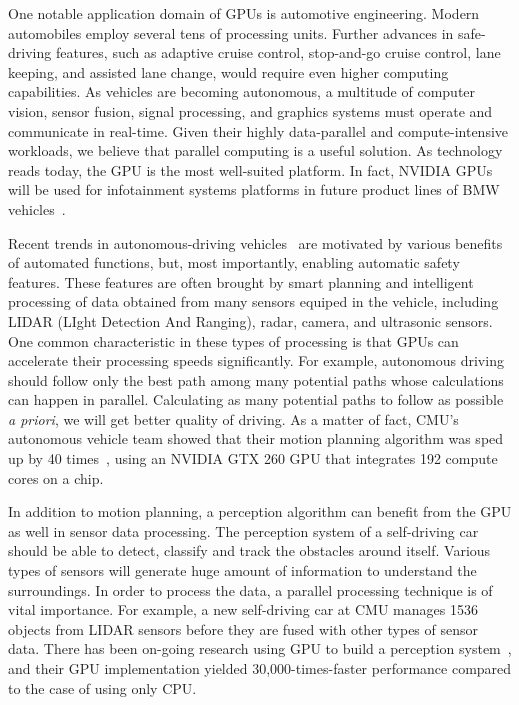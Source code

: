 \documentclass[times, 10pt, twocolumn]{article}
\begin{document}
One notable application domain of GPUs is automotive engineering.
Modern automobiles employ several tens of processing units.
Further advances in safe-driving features, such as adaptive
cruise control, stop-and-go cruise control, lane keeping, and assisted
lane change, would require even higher computing capabilities.
As vehicles are becoming autonomous, a multitude of computer vision,
sensor fusion, signal processing, and graphics systems must operate and
communicate in real-time.
Given their highly data-parallel and compute-intensive workloads, 
we believe that parallel computing is a useful solution.
As technology reads today, the GPU is the most well-suited platform.
In fact, NVIDIA GPUs will be used for infotainment systems platforms in
future product lines of BMW vehicles~\cite{NVIDIA_BMW}.

Recent trends in autonomous-driving vehicles~\cite{Kelly12, Markoff10,
Urmson08} are motivated by various benefits of automated functions,
but, most importantly, enabling automatic safety features. 
These features are often brought by smart planning and intelligent
processing of data obtained from many sensors equiped in the vehicle,
including LIDAR (LIght Detection And Ranging), radar, camera, and
ultrasonic sensors. 
One common characteristic in these types of processing is that GPUs can
accelerate their processing speeds significantly.
For example, autonomous driving should follow only the best path among
many potential paths whose calculations can happen in parallel.
Calculating as many potential paths to follow as possible
{\it a priori}, we will get better quality of driving.
As a matter of fact, CMU's autonomous vehicle team showed that their
motion planning algorithm was sped up by 40 times~\cite{McNaughton11},
using an NVIDIA GTX 260 GPU that integrates 192 compute cores on a
chip.

In addition to motion planning, a perception algorithm can benefit
from the GPU as well in sensor data processing.
The perception system of a self-driving car should
be able to detect, classify and track the obstacles around
itself. Various types of sensors will generate huge amount of
information to understand the surroundings. In order to process the
data, a parallel processing technique is of vital importance. For
example, a new self-driving car at CMU manages 1536 objects from LIDAR
sensors before they are fused with other types of sensor data. There has
been on-going research using GPU to build a perception
system~\cite{Ferreira11}, and their GPU implementation yielded
30,000-times-faster performance compared to the case of using only CPU. 
\end{document}
